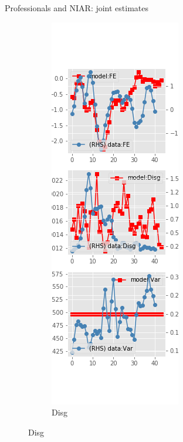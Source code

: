 \documentclass{beamer}
\begin{document}
\begin{frame}{Professionals and NIAR: joint estimates}
\begin{figure}[ht]
\begin{subfigure}[b]{0.2\textwidth}
		\end{subfigure}
		\hfill
		\begin{subfigure}[b]{0.2\textwidth}
			\caption{Disg}
			\includegraphics[width=\textwidth, height = 0.8\textheight]{figuresDraft/spf_ni_est_joint_diag1.png}

\end{subfigure}
\end{figure}
\end{frame}
\end{document}
